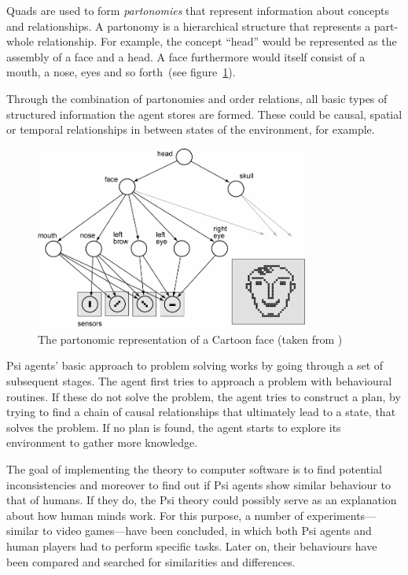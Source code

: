 Quads are used to form \emph{partonomies} that represent information about concepts and relationships. A partonomy is a hierarchical structure that represents a part-whole relationship. For example, the concept ``head'' would be represented as the assembly of a face and a head. A face furthermore would itself consist of a mouth, a nose, eyes and so forth~(see figure~\ref{partonomy}). 

Through the combination of partonomies and order relations, all basic types of structured information the agent stores are formed. These could be causal, spatial or temporal relationships in between states of the environment, for example.

\begin{figure}[h]
  \centering
    \includegraphics[width=9cm]{graphics/partonomy}
  \caption{The partonomic representation of a Cartoon face (taken from \cite{Bach:2009:PSI:1611304})}
  \label{partonomy}
\end{figure}

Psi agents' basic approach to problem solving works by going through a set of subsequent stages. The agent first tries to approach a problem with behavioural routines. If these do not solve the problem, the agent tries to construct a plan, by trying to find a chain of causal relationships that ultimately lead to a state, that solves the problem. If no plan is found, the agent starts to explore its environment to gather more knowledge.

The goal of implementing the theory to computer software is to find potential inconsistencies and moreover to find out if Psi agents show similar behaviour to that of humans. If they do, the Psi theory could possibly serve as an explanation about how human minds work. For this purpose, a number of experiments---similar to video games---have been concluded, in which both Psi agents and human players had to perform specific tasks. Later on, their behaviours have been compared and searched for similarities and differences.

